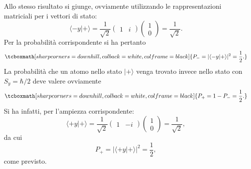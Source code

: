 \documentclass[a4paper,12pt,oneside]{book}
\begin{document}
Allo stesso risultato si giunge, ovviamente utilizzando le rappresentazioni matriciali per i vettori di stato:
	\begin{equation}
		\langle -y | + \rangle= \frac{1}{\sqrt{2}}
		\begin{pmatrix}
		1 & i
		\end{pmatrix}
		\begin{pmatrix}
		1 \\
		0
		\end{pmatrix}=
		\frac{1}{\sqrt{2}} .
	\end{equation}
Per la probabilità corrispondente si ha pertanto
	\begin{equation}
		\tcboxmath[sharp corners=downhill, colback=white, colframe=black]{
			P_-= |\langle -y | + \rangle |^2=\frac{1}{2} .
			}
	\end{equation}
La probabilità che un atomo nello stato $| + \rangle $  venga trovato invece nello stato con $S_y=\hbar/2$ deve valere ovviamente
	\begin{equation}
		\tcboxmath[sharp corners=downhill, colback=white, colframe=black]{
			P_+= 1-P_-=\frac{1}{2} .
			}
	\end{equation}
Si ha infatti, per l'ampiezza corrispondente:
	\begin{equation}
		\langle +y | + \rangle = \frac{1}{\sqrt{2}}
		\begin{pmatrix}
		1 & -i
		\end{pmatrix}
		\begin{pmatrix}
		1 \\
		0
		\end{pmatrix}=
		\frac{1}{\sqrt{2}} ,
	\end{equation}
da cui
	\begin{equation}
		P_+= |\langle +y | + \rangle |^2=\frac{1}{2} ,
		\end{equation}
come previsto.\\
\end{document}
